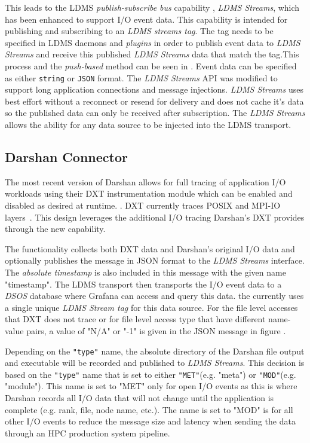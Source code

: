 \documentclass[conference]{IEEEtran}
\begin{document}
This leads to the LDMS \emph{publish-subscribe bus} capability , \emph{LDMS Streams}, which has been enhanced to support I/O event data. This capability is intended for publishing and subscribing to an \emph{LDMS streams tag}. The tag needs to be specified in LDMS daemons and \emph{plugins} in order to publish event data to \emph{LDMS Streams} and receive this published \emph{LDMS Streams} data that match the tag.This process and the \emph{push-based} method can be seen in . Event data can be specified as either \texttt{string} or \texttt{JSON} format. The \emph{LDMS Streams} API was modified to support long application connections and message injections. \emph{LDMS Streams} uses best effort without a reconnect or resend for delivery and does not cache it's data so the published data can only be received after subscription. The \emph{LDMS Streams} allows the ability for any data source to be injected into the LDMS transport.

\subsection{Darshan Connector}

The most recent version of Darshan allows for full tracing of application I/O workloads using their DXT instrumentation module which can be enabled and disabled as desired at runtime. . DXT currently traces POSIX and MPI-IO layers~\cite{darshan-runtime}. This design leverages the additional I/O tracing Darshan's DXT provides through the new \connector capability.


The \connector functionality collects both DXT data and Darshan's original I/O data and optionally publishes the message in JSON format to the \emph{LDMS Streams} interface. The \emph{absolute timestamp} is also included in this message with the given name "timestamp". The LDMS transport then transports the I/O event data to a \emph{DSOS} database where Grafana can access and query this data. the \connector currently uses a single unique \emph{LDMS Stream tag} for this data source. For the file level accesses that DXT does not trace or for file level access type that have different name-value pairs, a value of "N/A" or "-1" is given in the JSON message in figure . 

Depending on the \texttt{"type"} name, the absolute directory of the Darshan file output and executable will be recorded and published to \emph{LDMS Streams}. This decision is based on the \texttt{"type"} name that is set to either \texttt{"MET"}(e.g. "meta") or \texttt{"MOD"}(e.g. "module"). This name is set to "MET" only for open I/O events as this is where Darshan records all I/O data that will not change until the application is complete (e.g. rank, file, node name, etc.). The name is set to "MOD" is for all other I/O events to reduce the message size and latency when sending the data through an HPC production system pipeline.
\end{document}
